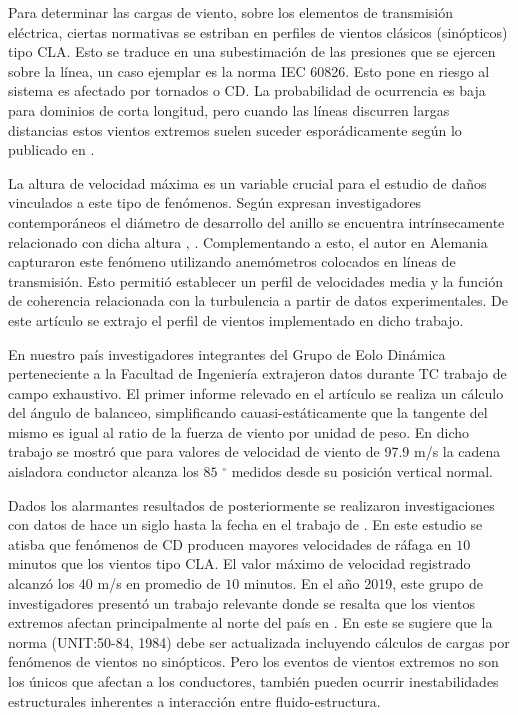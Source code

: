 Para determinar las cargas de viento, sobre los elementos de transmisión eléctrica, ciertas normativas se estriban en perfiles de vientos clásicos (sinópticos) tipo \gls{CLA}. Esto se traduce en una subestimación de las presiones que se ejercen sobre la línea, un caso ejemplar es la norma \gls{IEC} 60826. Esto pone en riesgo al sistema es afectado por tornados o CD. La probabilidad de ocurrencia es baja para dominios de corta longitud, pero cuando las líneas discurren largas distancias estos vientos extremos suelen suceder esporádicamente según lo publicado en \citep{ang1984probability}. 

La altura de velocidad máxima es un variable crucial para el estudio de daños vinculados a este tipo de fenómenos. Según expresan investigadores contemporáneos el diámetro de desarrollo del anillo se encuentra intrínsecamente relacionado con dicha altura \citep{holmes2002re}, \citep{abd2013coupled}. Complementando a esto, el autor \cite{stengel2017measurements} en Alemania capturaron este fenómeno utilizando anemómetros colocados en líneas de transmisión. Esto permitió establecer un perfil de velocidades media y la función de coherencia relacionada con la turbulencia a partir de datos experimentales. De este artículo se extrajo el perfil de vientos implementado en dicho trabajo.

En nuestro país investigadores integrantes del Grupo de Eolo Dinámica perteneciente a la Facultad de Ingeniería extrajeron datos durante TC trabajo de campo exhaustivo. El primer informe relevado en el artículo \citep{duranona2009analysis} se realiza un cálculo del ángulo de balanceo, simplificando cauasi-estáticamente que la tangente del mismo es igual al ratio de la fuerza de viento por unidad de peso. En dicho trabajo se mostró que para valores de velocidad de viento de 97.9 m/s la cadena aisladora conductor alcanza los $85$ $^\circ$ medidos desde su posición vertical normal.

Dados los alarmantes resultados de \citep{duranona2009analysis} posteriormente se realizaron investigaciones con datos de hace un siglo hasta la fecha en el trabajo de \citep{duranona2015significance}. En este estudio se atisba que fenómenos de CD producen mayores velocidades de ráfaga en $10$ minutos que los vientos tipo CLA. El valor máximo de velocidad registrado alcanzó los $40$ m/s en promedio de $10$ minutos. En el año 2019, este grupo de investigadores presentó un trabajo relevante donde se resalta que los vientos extremos afectan principalmente al norte del país en \citep{duranona2019first}. En este se sugiere que la norma (\gls{UNIT}:50-84, 1984) debe ser actualizada incluyendo cálculos de cargas por fenómenos de vientos no sinópticos. Pero los eventos de vientos extremos no son los únicos que afectan a los conductores, también pueden ocurrir inestabilidades estructurales inherentes a interacción entre fluido-estructura. 


